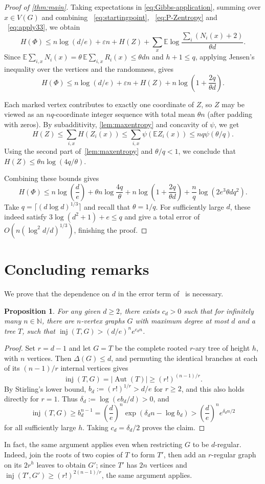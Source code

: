\documentclass[reqno,final,a4paper]{amsart}
\numberwithin{equation}{section}
\newtheorem{proposition}[theorem]{Proposition}
\theoremstyle{definition}
\theoremstyle{remark}
\DeclareMathOperator{\Aut}{Aut}
\DeclareMathOperator{\inj}{inj}
\newcommand{\eps}{\varepsilon}
\begin{document}
\begin{proof}[Proof of \cref{thm:main}]
Taking expectations in \eqref{eq:Gibbs-application}, summing over $x\in V(G)$ and combining ~\eqref{eq:startingpoint},  ~\eqref{eq:P-Zentropy} and ~\eqref{eq:apply33}, we obtain
\[
H(\Phi)\le
n\log(d/e)+\eps n+H(Z)
+\sum_x\mathbb E\log\frac{\sum_i(N_i(x)+2)}{\theta d}.
\]
Since $\mathbb E\sum_{i,x}N_i(x) =\theta\,\mathbb E\sum_{i,x}R_i(x) \le\theta dn$ and $h+1\le q$, applying Jensen's inequality over the vertices and the randomness, gives
$$H(\Phi)\leq n\log(d/e)+\eps n+H(Z)+n\log\left(1+\frac{2q}{\theta d}\right).$$

Each marked vertex contributes to exactly one coordinate of $Z$, so $Z$ may be viewed as an $nq$-coordinate integer sequence with total mean $\theta n$ (after padding with zeros). By subadditivity, \cref{lem:maxentropy} and concavity of $\psi$, we get
$$H(Z)\leq \sum_{i,x}H(Z_i(x))\leq \sum_{i,x}\psi(\mathbb{E}Z_i(x))\leq nq\psi(\theta/q).$$
Using the second part of~\cref{lem:maxentropy} and $\theta/q<1$, we conclude that $H(Z) \leq \theta n \log (4q / \theta)$.

Combining these bounds gives 
$$H(\Phi)\leq n\log\left(\frac de\right)+\theta n\log \frac{4q}{\theta}+n\log\left(1+\frac{2q}{\theta d}\right)+\frac{n}{q}\log(2e^3\theta d q^2).$$
Take $q=\lceil(d\log d)^{1/3}\rceil$ and recall that $\theta=1/q$.
For sufficiently large $d$, these indeed satisfy $3\log(d^2+1)+e\leq q$ and give a total error of $O(n(\log^2 d/d)^{1/3})$, finishing the proof.
\end{proof}

\section{Concluding remarks}\label{sec:concluding}
We prove that the dependence on $d$ in the error term of~ is necessary.
\begin{proposition}\label{prop:example}
    For any given $d\geq 2$, there exists $c_d>0$ such that for infinitely many $n\in \mathbb N$, there are $n$-vertex graphs $G$ with maximum degree at most $d$ and a tree $T$, such that $\inj(T,G)> (d/e)^n e^{c_d n}$.
\end{proposition}
\begin{proof}
Set $r=d-1$ and let $G=T$ be the complete rooted $r$-ary tree of height $h$, with $n$ vertices. Then $\Delta(G)\le d$, and permuting the identical branches at each of its $(n-1)/r$ internal vertices gives
\[
    \inj(T,G)=|\Aut(T)|\ge (r!)^{(n-1)/r}.
\]
By Stirling's lower bound, $b_d:=(r!)^{1/r}>d/e$ for $r\ge2$, and this also holds directly for $r=1$. Thus $\delta_d:=\log(eb_d/d)>0$, and
\[
    \inj(T,G)\ge b_d^{n-1}
    =\left(\frac de\right)^n\exp\!\left(\delta_dn-\log b_d\right)
    >\left(\frac de\right)^n e^{\delta_dn/2}
\]
for all sufficiently large $h$. Taking $c_d=\delta_d/2$ proves the claim.
\end{proof}
In fact, the same argument applies even when restricting $G$ to be $d$-regular. Indeed, join the roots of two copies of $T$ to form $T'$, then add an $r$-regular graph on its $2r^h$ leaves to obtain $G'$; since $T'$ has $2n$ vertices and $\inj(T',G')\ge(r!)^{2(n-1)/r}$, the same argument applies.
\end{document}
